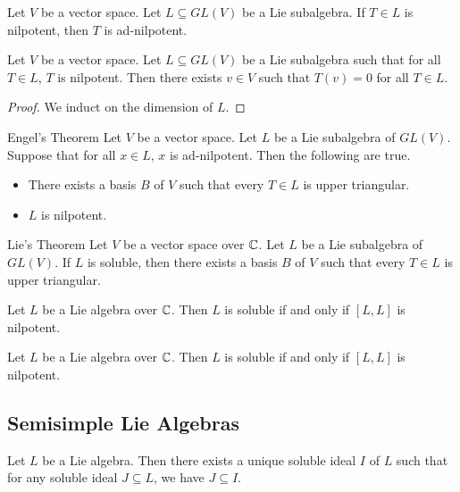 \documentclass[a4paper]{article}
\begin{document}
\begin{lmm}{}{} Let $V$ be a vector space. Let $L\subseteq GL(V)$ be a Lie subalgebra. If $T\in L$ is nilpotent, then $T$ is ad-nilpotent. 
\end{lmm}

\begin{prp}{}{} Let $V$ be a vector space. Let $L\subseteq GL(V)$ be a Lie subalgebra such that for all $T\in L$, $T$ is nilpotent. Then there exists $v\in V$ such that $T(v)=0$ for all $T\in L$. \tcbline
\begin{proof}
We induct on the dimension of $L$. 
\end{proof}
\end{prp}

\begin{thm}{Engel's Theorem}{} Let $V$ be a vector space. Let $L$ be a Lie subalgebra of $GL(V)$. Suppose that for all $x\in L$, $x$ is ad-nilpotent. Then the following are true. 
\begin{itemize}
\item There exists a basis $B$ of $V$ such that every $T\in L$ is upper triangular. 
\item $L$ is nilpotent. 
\end{itemize}
\end{thm}

\begin{thm}{Lie's Theorem}{} Let $V$ be a vector space over $\mathbb{C}$. Let $L$ be a Lie subalgebra of $GL(V)$. If $L$ is soluble, then there exists a basis $B$ of $V$ such that every $T\in L$ is upper triangular. 
\end{thm}

\begin{crl}{}{} Let $L$ be a Lie algebra over $\mathbb{C}$. Then $L$ is soluble if and only if $[L,L]$ is nilpotent. 
\end{crl}

\begin{crl}{}{} Let $L$ be a Lie algebra over $\mathbb{C}$. Then $L$ is soluble if and only if $[L,L]$ is nilpotent. 
\end{crl}

\subsection{Semisimple Lie Algebras}
\begin{prp}{}{} Let $L$ be a Lie algebra. Then there exists a unique soluble ideal $I$ of $L$ such that for any soluble ideal $J\subseteq L$, we have $J\subseteq I$. 
\end{prp}
\end{document}

